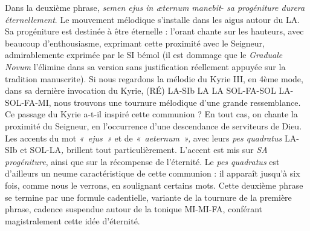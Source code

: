 \documentclass[Session2026.tex]{subfiles}
\begin{document}
Dans la deuxième phrase, \emph{semen ejus in æternum manebit}- \emph{sa
progéniture durera éternellement}. Le mouvement mélodique s'installe
dans les aigus autour du LA. Sa progéniture est destinée à être
éternelle : l'orant chante sur les hauteurs, avec beaucoup
d'enthousiasme, exprimant cette proximité avec le Seigneur,
admirablemente exprimée par le SI bémol (il est dommage que le
\emph{Graduale Novum} l'élimine dans sa version sans justification
réellement appuyée sur la tradition manuscrite). Si nous regardons la
mélodie du Kyrie III, en 4ème mode, dans sa dernière invocation du
Kyrie, (RÉ) LA-SIb LA LA SOL-FA-SOL LA-SOL-FA-MI, nous trouvons une
tournure mélodique d'une grande ressemblance. Ce passage du Kyrie a-t-il
inspiré cette communion ? En tout cas, on chante la proximité du
Seigneur, en l'occurrence d'une descendance de serviteurs de Dieu. Les
accents du mot \emph{«~ejus~»} et de \emph{«~aeternum~»,} avec leurs
\emph{pes quadratus} LA-SIb et SOL-LA\emph{,} brillent tout
particulièrement. L'accent est mis sur \emph{SA progéniture}, ainsi que
sur la récompense de l'éternité. Le \emph{pes quadratus} est d'ailleurs
un neume caractéristique de cette communion : il apparaît jusqu'à six
fois, comme nous le verrons, en soulignant certains mots. Cette deuxième
phrase se termine par une formule cadentielle, variante de la tournure
de la première phrase, cadence suspendue autour de la tonique MI-MI-FA,
conférant magistralement cette idée d'éternité.
\end{document}
